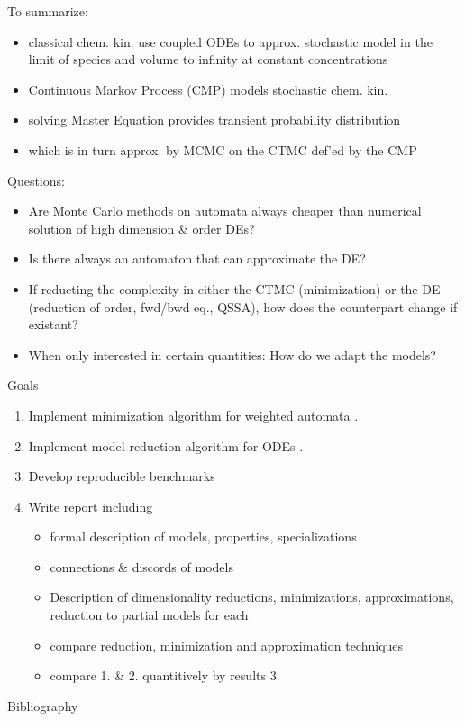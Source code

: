 \documentclass[rgb]{beamer}
\begin{document}
    \begin{frame}
        To summarize:
        \begin{itemize}
             \item classical chem. kin. use coupled ODEs to approx. stochastic model in the limit of species and volume to infinity at constant concentrations
             \item Continuous Markov Process (CMP) models stochastic chem. kin.
             \item solving Master Equation provides transient probability distribution
             \item which is in turn approx. by MCMC on the CTMC def'ed by the CMP
        \end{itemize}
        Questions:
        \begin{itemize}
         \item Are Monte Carlo methods on automata always cheaper than numerical solution of high dimension \& order DEs?
         \item Is there always an automaton that can approximate the DE?
         \item If reducting the complexity in either the CTMC (minimization) or the DE (reduction of order, fwd/bwd eq., QSSA), how does the counterpart change if existant?
         \item When only interested in certain quantities: How do we adapt the models?
        \end{itemize}

       
    \end{frame}

    
    \begin{frame}{Goals}
        \begin{enumerate}
            \item Implement minimization algorithm for weighted automata \autocite{Kiefer2013OnTC}.
            \item Implement model reduction algorithm for ODEs \autocite{Cardelli2017MaximalAO}.
            \item Develop reproducible benchmarks
            \item Write report including 
                \begin{itemize}
                 \item formal description of models, properties, specializations
                 \item connections \& discords of models
                 \item Description of dimensionality reductions, minimizations, approximations, reduction to partial models for each
                 \item compare reduction, minimization and approximation techniques
                 \item compare 1. \& 2. quantitively by results 3.
                \end{itemize}
        \end{enumerate}
    \end{frame}

    
    \begin{frame}{Bibliography}
        \printbibliography
    \end{frame}
\end{document}
